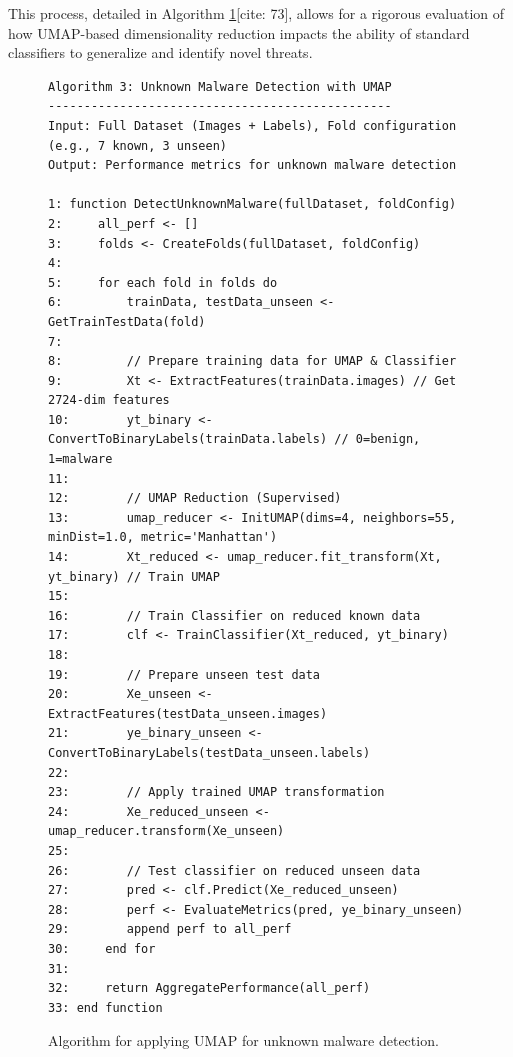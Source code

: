This process, detailed in Algorithm \ref{alg:umap_detection}[cite: 73], allows for a rigorous evaluation of how UMAP-based dimensionality reduction impacts the ability of standard classifiers to generalize and identify novel threats.

\begin{figure}[h!]
\centering
\begin{verbatim}
Algorithm 3: Unknown Malware Detection with UMAP
------------------------------------------------
Input: Full Dataset (Images + Labels), Fold configuration (e.g., 7 known, 3 unseen)
Output: Performance metrics for unknown malware detection

1: function DetectUnknownMalware(fullDataset, foldConfig)
2:     all_perf <- []
3:     folds <- CreateFolds(fullDataset, foldConfig)
4:     
5:     for each fold in folds do
6:         trainData, testData_unseen <- GetTrainTestData(fold)
7:         
8:         // Prepare training data for UMAP & Classifier
9:         Xt <- ExtractFeatures(trainData.images) // Get 2724-dim features
10:        yt_binary <- ConvertToBinaryLabels(trainData.labels) // 0=benign, 1=malware
11:       
12:        // UMAP Reduction (Supervised)
13:        umap_reducer <- InitUMAP(dims=4, neighbors=55, minDist=1.0, metric='Manhattan')
14:        Xt_reduced <- umap_reducer.fit_transform(Xt, yt_binary) // Train UMAP
15:       
16:        // Train Classifier on reduced known data
17:        clf <- TrainClassifier(Xt_reduced, yt_binary) 
18:       
19:        // Prepare unseen test data
20:        Xe_unseen <- ExtractFeatures(testData_unseen.images)
21:        ye_binary_unseen <- ConvertToBinaryLabels(testData_unseen.labels)
22:       
23:        // Apply trained UMAP transformation
24:        Xe_reduced_unseen <- umap_reducer.transform(Xe_unseen) 
25:       
26:        // Test classifier on reduced unseen data
27:        pred <- clf.Predict(Xe_reduced_unseen)
28:        perf <- EvaluateMetrics(pred, ye_binary_unseen)
29:        append perf to all_perf
30:     end for
31:     
32:     return AggregatePerformance(all_perf)
33: end function
\end{verbatim}
\caption{Algorithm for applying UMAP for unknown malware detection.}
\label{alg:umap_detection}
\end{figure}

